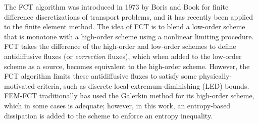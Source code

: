 The FCT algorithm was introduced in 1973 by Boris and Book\cite{borisbook} for
finite difference discretizations of transport problems, and it has
recently been applied to the finite element method. The idea of FCT
is to blend a low-order scheme that is monotone with a high-order
scheme using a nonlinear limiting procedure. FCT takes the difference
of the high-order and low-order schemes to define antidiffusive
fluxes (or \emph{correction} fluxes), which when added to the low-order
scheme as a source, becomes equivalent to the high-order scheme. However,
the FCT algorithm limits these antidiffusive fluxes to satisfy some
physically-motivated criteria, such as discrete local-extremum-diminishing
(LED) bounds. FEM-FCT traditionally has used the Galerkin method for
its high-order scheme, which in some cases is adequate; however, in
this work, an entropy-based dissipation is added to the scheme to enforce
an entropy inequality.

